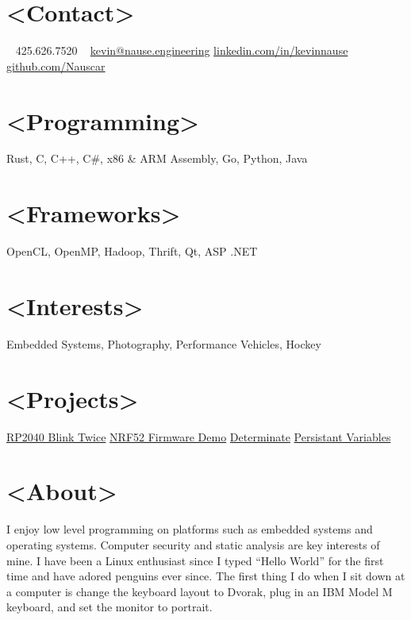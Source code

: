 \documentclass[print]{friggeri-cv} %
\begin{document}


\begin{aside} %
\section{<Contact>}
~
425.626.7520
~
{\scriptsize \href{mailto:kevin@nause.engineering}{kevin@nause.engineering}}
{\scriptsize \href{https://linkedin.com/in/kevinnause}{linkedin.com/in/kevinnause}}
{\scriptsize \href{https://github.com/Nauscar}{github.com/Nauscar}}
\section{<Programming>}
Rust, C, C++, C\#,
x86 \& ARM Assembly,
Go, Python, Java
\section{<Frameworks>}
OpenCL, OpenMP,
Hadoop, Thrift,
Qt, ASP .NET
\section{<Interests>}
{Embedded Systems, Photography, Performance Vehicles, Hockey}
\section{<Projects>}
{\href{https://github.com/Nauscar/rp-blink-twice}{RP2040 Blink Twice}}
{\href{https://github.com/Nauscar/nrf52-fw-demo}{NRF52 Firmware Demo}}
{\href{https://github.com/Nauscar/determinate}{Determinate}}
{\href{https://github.com/Nauscar/block-rs}{Persistant Variables}}
\section{<About>}
{I enjoy low level programming on platforms such as embedded systems and operating systems.
Computer security and static analysis are key interests of mine.
I have been a Linux enthusiast since I typed ``Hello World'' for the first time and have adored penguins ever since.
The first thing I do when I sit down at a computer is change the keyboard layout to Dvorak, plug in an IBM Model M keyboard, and set the monitor to portrait.}
\end{aside}
\end{document}
